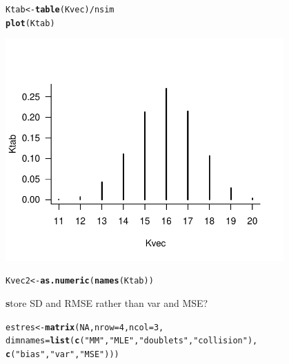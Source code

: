 \documentclass{article}\usepackage[]{graphicx}\usepackage[]{color}
\makeatletter
\newcommand{\hlnum}[1]{\textcolor[rgb]{0.686,0.059,0.569}{#1}}%
\newcommand{\hlstr}[1]{\textcolor[rgb]{0.192,0.494,0.8}{#1}}%
\newcommand{\hlopt}[1]{\textcolor[rgb]{0,0,0}{#1}}%
\newcommand{\hlstd}[1]{\textcolor[rgb]{0.345,0.345,0.345}{#1}}%
\newcommand{\hlkwb}[1]{\textcolor[rgb]{0.69,0.353,0.396}{#1}}%
\newcommand{\hlkwc}[1]{\textcolor[rgb]{0.333,0.667,0.333}{#1}}%
\newcommand{\hlkwd}[1]{\textcolor[rgb]{0.737,0.353,0.396}{\textbf{#1}}}%
\newenvironment{kframe}{%
 \def\at@end@of@kframe{}%
 \ifinner\ifhmode%
  \def\at@end@of@kframe{\end{minipage}}%
  \begin{minipage}{\columnwidth}%
 \fi\fi%
 \def\FrameCommand##1{\hskip\@totalleftmargin \hskip-\fboxsep
 \colorbox{shadecolor}{##1}\hskip-\fboxsep
     \hskip-\linewidth \hskip-\@totalleftmargin \hskip\columnwidth}%
 \MakeFramed {\advance\hsize-\width
   \@totalleftmargin\z@ \linewidth\hsize
   \@setminipage}}%
 {\par\unskip\endMakeFramed%
 \at@end@of@kframe}
\newenvironment{knitrout}{}{} %
\newcommand{\fixme}[1]{{\textbf #1}}
\newcommand{\fixme}[1]{\textbf{FIXME: #1}}
\makeatother
\begin{document}
\begin{knitrout}
\color{fgcolor}\begin{kframe}
\begin{alltt}
\hlstd{Ktab} \hlkwb{<-} \hlkwd{table}\hlstd{(Kvec)}\hlopt{/}\hlstd{nsim}
\hlkwd{plot}\hlstd{(Ktab)}
\end{alltt}
\end{kframe}
\includegraphics[width=0.8\textwidth]{figure/Ktab-1} 
\begin{kframe}\begin{alltt}
\hlstd{Kvec2} \hlkwb{<-} \hlkwd{as.numeric}\hlstd{(}\hlkwd{names}\hlstd{(Ktab))}
\end{alltt}
\end{kframe}
\end{knitrout}

\fixme{store SD and RMSE rather than var and MSE?}
\begin{knitrout}
\color{fgcolor}\begin{kframe}
\begin{alltt}
\hlstd{estres} \hlkwb{<-} \hlkwd{matrix}\hlstd{(}\hlnum{NA}\hlstd{,}\hlkwc{nrow}\hlstd{=}\hlnum{4}\hlstd{,}\hlkwc{ncol}\hlstd{=}\hlnum{3}\hlstd{,}
                 \hlkwc{dimnames}\hlstd{=}\hlkwd{list}\hlstd{(}\hlkwd{c}\hlstd{(}\hlstr{"MM"}\hlstd{,}\hlstr{"MLE"}\hlstd{,}\hlstr{"doublets"}\hlstd{,}\hlstr{"collision"}\hlstd{),}
                 \hlkwd{c}\hlstd{(}\hlstr{"bias"}\hlstd{,}\hlstr{"var"}\hlstd{,}\hlstr{"MSE"}\hlstd{)))}
\end{alltt}
\end{kframe}
\end{knitrout}
\end{document}
